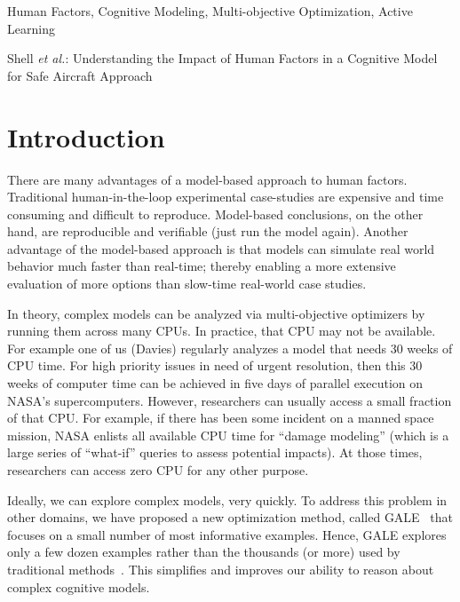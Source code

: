 \documentclass[journal]{IEEEtran}
\begin{document}
\begin{keywords}
Human Factors, Cognitive Modeling, Multi-objective Optimization, Active Learning
\end{keywords}


%
{Shell \MakeLowercase{\textit{et al.}}: Understanding the Impact of Human Factors in a Cognitive Model for Safe Aircraft Approach}


\IEEEdisplaynotcompsoctitleabstractindextext
\IEEEpeerreviewmaketitle



\section{Introduction}
There are many advantages of a model-based approach to human factors. 
Traditional human-in-the-loop experimental case-studies are expensive and time consuming and difficult to reproduce.
Model-based conclusions, on the other hand, are reproducible and verifiable (just run the model again).
Another advantage of the model-based approach is that models can simulate real world behavior much faster than real-time;
thereby enabling a more extensive evaluation of more options
than slow-time real-world case studies.

In theory, complex models can be 
analyzed via multi-objective optimizers by running them across many CPUs. 
In practice, that CPU may not be available.
For example one of us (Davies) regularly analyzes a model
that needs 30 weeks of CPU time. For high priority issues in need of urgent resolution,
then this 30 weeks of computer time can be achieved in five days of parallel execution on NASA's supercomputers.
However,  researchers can usually
access a small fraction of that CPU. 
For example, if there has been some incident on a manned space mission,  NASA enlists all available CPU time for ``damage modeling'' (which is a large series of ``what-if'' queries to assess potential impacts). 
At those times, researchers can access zero CPU for any other purpose. 

Ideally, we can explore complex models, very quickly.
To address this problem in other domains, we have proposed a
new optimization method, called GALE~\cite{krall14aaai,krallphd,galepaper}
that  focuses on  a small number of most informative examples.
Hence, GALE explores only a few dozen examples rather than the thousands (or more) used  by traditional methods~\cite{galepaper,krall14aaai}. 
This simplifies and improves our ability to reason about complex cognitive models.
\end{document}
